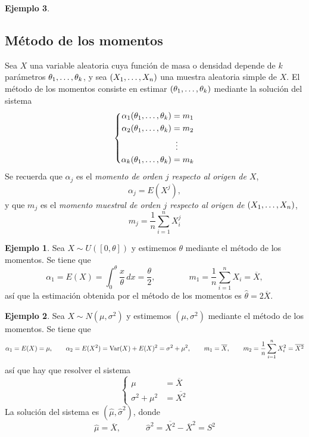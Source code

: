\documentclass[11pt]{report}
\theoremstyle{definition}
\newtheorem{example}{Ejemplo}
\begin{document}
\begin{example}
\subsection{Método de los momentos}

Sea $X$ una variable aleatoria cuya función de masa o densidad depende de $k$ parámetros $\theta_1,\mathellipsis,\theta_k$, y sea $(X_1,\mathellipsis,X_n)$ una muestra aleatoria simple de $X$. El método de los momentos consiste en estimar $(\theta_1,\mathellipsis,\theta_k)$ mediante la solución del sistema
\[\left\{\begin{alignedat}{1}
    \alpha_1(\theta_1,\mathellipsis,\theta_k) &= m_1 \\
    \alpha_2(\theta_1,\mathellipsis,\theta_k) &= m_2 \\
    & \ \vdots \\
    \alpha_k(\theta_1,\mathellipsis,\theta_k) &= m_k
    \end{alignedat}\right.\]
Se recuerda que $\alpha_j$ es el \emph{momento de orden $j$ respecto al origen de $X$},
\[\alpha_j = E(X^j),\]
y que $m_j$ es el \emph{momento muestral de orden $j$ respecto al origen de $(X_1,\mathellipsis,X_n)$},
\[m_j = \frac{1}{n}\sum_{i=1}^n X_i^j\]

\begin{example}
Sea $X \sim U([0,\theta])$ y estimemos $\theta$ mediante el método de los momentos. Se tiene que
\[\alpha_1 = E(X) = \int_0^\theta \frac{x}{\theta} \, dx = \frac{\theta}{2}, \qquad \qquad m_1 = \frac{1}{n}\sum_{i=1}^n X_i = \overline{X},\]
así que la estimación obtenida por el método de los momentos es $\hat{\theta} = 2\overline{X}$.
\end{example}

\begin{example}
Sea $X \sim N(\mu,\sigma^2)$ y estimemos $(\mu,\sigma^2)$ mediante el método de los momentos. Se tiene que
\[\alpha_1 = E(X) = \mu, \qquad \alpha_2 = E(X^2) = \textup{Var}(X)+E(X)^2 = \sigma^2+\mu^2, \qquad m_1 = \overline{X}, \qquad m_2 = \frac{1}{n}\sum_{i=1}^n X_i^2 = \overline{X^2} \]
así que hay que resolver el sistema
\[\left\{\begin{alignedat}{1}
    \mu &= \overline{X} \\
    \sigma^2+\mu^2 &=\overline{X^2}
    \end{alignedat}\right.\]
La solución del sistema es $(\hat{\mu},\hat{\sigma}^2)$, donde
\[\hat{\mu} = \overline{X}, \quad \qquad \hat{\sigma}^2 = \overline{X^2}-\overline{X}^2 = S^2\]
\end{example}


\end{example}
\end{document}
